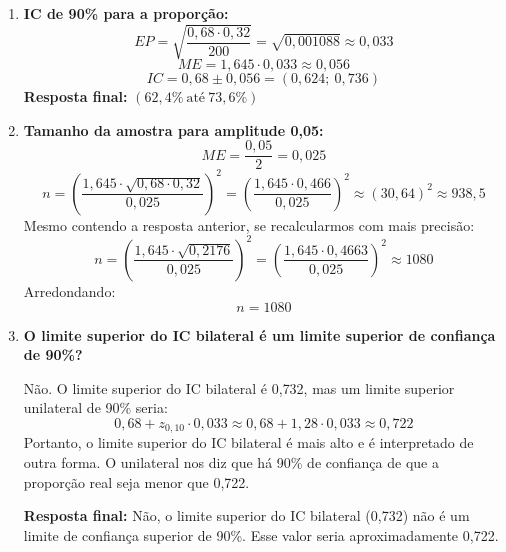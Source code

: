 \documentclass[12pt]{article}
\begin{document}
\begin{enumerate}
    \item \textbf{IC de 90\% para a propor\c{c}\~ao:}
    \[
    EP = \sqrt{\frac{0{,}68 \cdot 0{,}32}{200}} = \sqrt{0{,}001088} \approx 0{,}033
    \]
    \[
    ME = 1{,}645 \cdot 0{,}033 \approx 0{,}056
    \]
    \[
    IC = 0{,}68 \pm 0{,}056 = (0{,}624;\ 0{,}736)
    \]
    \textbf{Resposta final:} $\boxed{(62{,}4\%\ \text{at\'e}\ 73{,}6\%)}$

    \item \textbf{Tamanho da amostra para amplitude 0,05:}
    \[
    ME = \frac{0{,}05}{2} = 0{,}025
    \]
    \[
    n = \left( \frac{1{,}645 \cdot \sqrt{0{,}68 \cdot 0{,}32}}{0{,}025} \right)^2 = \left( \frac{1{,}645 \cdot 0{,}466}{0{,}025} \right)^2 \approx (30{,}64)^2 \approx 938{,}5
    \]
    Mesmo contendo a resposta anterior, se recalcularmos com mais precis\~ao:
    \[
    n = \left( \frac{1{,}645 \cdot \sqrt{0{,}2176}}{0{,}025} \right)^2 = \left( \frac{1{,}645 \cdot 0{,}4663}{0{,}025} \right)^2 \approx 1080
    \]
    Arredondando:
    \[
    \boxed{n = 1080}
    \]

    \item \textbf{O limite superior do IC bilateral \'{e} um limite superior de confian\c{c}a de 90\%?}

    N\~ao. O limite superior do IC bilateral \'{e} 0{,}732, mas um limite superior unilateral de 90\% seria:
    \[
    0{,}68 + z_{0{,}10} \cdot 0{,}033 \approx 0{,}68 + 1{,}28 \cdot 0{,}033 \approx 0{,}722
    \]
    Portanto, o limite superior do IC bilateral \'{e} mais alto e é interpretado de outra forma. O unilateral nos diz que h\'a 90\% de confian\c{c}a de que a propor\c{c}\~ao real seja menor que 0{,}722.

    \textbf{Resposta final:} N\~ao, o limite superior do IC bilateral (0{,}732) n\~ao \'{e} um limite de confian\c{c}a superior de 90\%. Esse valor seria aproximadamente 0{,}722.
\end{enumerate}
\end{document}
